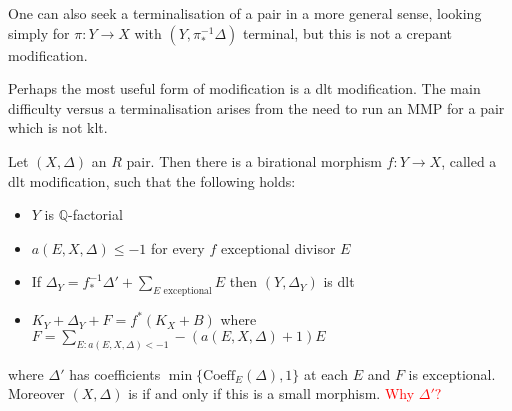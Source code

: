 \documentclass[a4paper,12pt]{book}
\newcommand\myworries[1]{\textcolor{red}{#1}}
\begin{document}
\begin{remark}
	
	One can also seek a terminalisation of a pair in a more general sense, looking simply for $\pi:Y \to X$ with $(Y,\pi_{*}^{-1}\Delta)$ terminal, but this is not a crepant modification.
	
	\end{remark}


Perhaps the most useful form of modification is a dlt modification. The main difficulty versus a terminalisation arises from the need to run an MMP for a pair which is not klt.

\begin{theorem}
	Let $(X,\Delta)$ an $R$ pair. Then there is a birational morphism $f:Y \to X$, called a dlt modification, such that the following holds:
	\begin{itemize}
		\item $Y$ is $\mathbb{Q}$-factorial
		\item $a(E,X,\Delta) \leq -1$ for every $f$ exceptional divisor $E$
		\item If $\Delta_{Y}=f^{-1}_{*}\Delta' + \sum_{E \text{ exceptional}} E$ then $(Y,\Delta_{Y})$ is dlt
		\item $K_{Y}+\Delta_{Y}+F=f^{*}(K_{X}+B)$ where $F= \sum_{E:a(E,X,\Delta)<-1} -(a(E,X,\Delta)+1)E$
	\end{itemize}
	where $\Delta'$ has coefficients $\min\{\text{Coeff}_{E}(\Delta),1\}$ at each $E$ and $F$ is exceptional. Moreover $(X,\Delta)$ is if and only if this is a small morphism.
	\myworries{Why $\Delta'?$}
\end{theorem}
\end{document}
